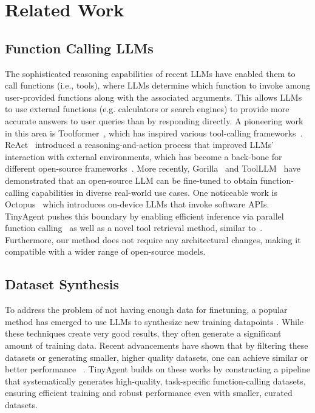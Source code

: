 \section{Related Work}
\subsection{Function Calling LLMs}
The sophisticated reasoning capabilities of recent LLMs have enabled them to call functions (i.e., tools), where LLMs determine which function to invoke among user-provided functions along with the associated arguments. 
This allows LLMs to use external functions (e.g. calculators or search engines) to provide more accurate answers to user queries than by responding directly.
A pioneering work in this area is Toolformer~\cite{schick2024toolformer}, which has inspired various tool-calling frameworks~\cite{ruan2023tptu,shen2024hugginggpt,liang2024taskmatrix}.
ReAct~\cite{yao2022react} introduced a reasoning-and-action process that improved LLMs' interaction with external environments, which has become a back-bone for different open-source frameworks~\cite{Liu_LlamaIndex_2022, langchain}.
More recently, Gorilla~\cite{patil2023gorilla} and ToolLLM~\cite{qin2023toolllm} have demonstrated that an open-source LLM can be fine-tuned to obtain function-calling capabilities in diverse real-world use cases.
One noticeable work is Octopus~\cite{chen2024octopus} which introduces on-device LLMs that invoke software APIs.
TinyAgent pushes this boundary by enabling efficient inference via parallel function calling~\cite{kim2023llm} as well as a novel tool retrieval method, similar to~\cite{moon2024efficient}.
Furthermore, our method does not require any architectural changes, making it compatible with a wider range of open-source models.

\subsection{Dataset Synthesis}
To address the problem of not having enough data for finetuning, a popular method has emerged to use LLMs to synthesize new training datapoints \cite{deng2023rephrase, prasad2023rephrase, fu2023specializing, dai2023auggpt, ubani2023zeroshotdataaug, 
fang2023using, liu2023tinygsm, yu2023metamath, kumar2020data, yoo2021gpt3mix,wang2022self,lee2024llm2llm}.
While these techniques create very good results, they often generate a significant amount of training data. Recent advancements have shown that by filtering these datasets or generating smaller, higher quality datasets, one can achieve similar or better performance ~\cite{chen2023alpagasus, cao2023instruction, wei2023instructiongpt4, zhou2023lima}. TinyAgent builds on these works by constructing a pipeline that systematically generates high-quality, task-specific function-calling datasets, ensuring efficient training and robust performance even with smaller, curated datasets.

